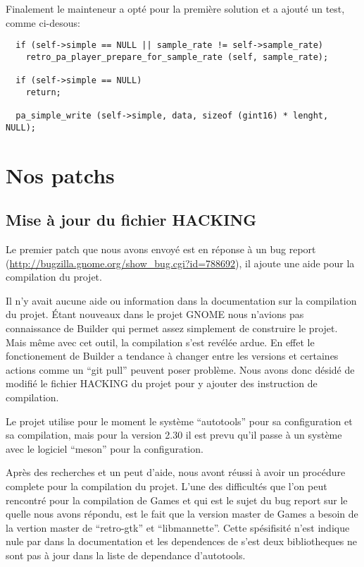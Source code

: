\documentclass[12pt]{report}
\begin{document}
Finalement le mainteneur a opté pour la première solution et a ajouté un test, comme
ci-desous:
\begin{verbatim}
  if (self->simple == NULL || sample_rate != self->sample_rate)
    retro_pa_player_prepare_for_sample_rate (self, sample_rate);

  if (self->simple == NULL)
    return;

  pa_simple_write (self->simple, data, sizeof (gint16) * lenght, NULL);
\end{verbatim}

\section{Nos patchs}
\subsection{Mise à jour du fichier HACKING}
\label{HACKING}
Le premier patch que nous avons envoyé est en réponse à un bug report
(\url{http://bugzilla.gnome.org/show_bug.cgi?id=788692}), il ajoute une aide
pour la compilation du projet.

Il n'y avait aucune aide ou information dans la documentation sur la compilation
du projet. Étant nouveaux dans le projet GNOME nous n'avions pas connaissance de 
Builder qui permet assez simplement de construire le projet. Mais même avec cet
outil, la compilation s'est revélée ardue. En effet le fonctionement de Builder a
tendance à changer entre les versions et certaines actions comme un ``git pull''
peuvent poser problème. Nous avons donc désidé de modifié le fichier HACKING du
projet pour y ajouter des instruction de compilation.

Le projet utilise pour le moment le système ``autotools'' pour sa configuration et 
sa compilation, mais pour la version 2.30 il est prevu qu'il passe à un système
avec le logiciel ``meson'' pour la configuration.

Après des recherches et un peut d'aide, nous avont réussi à avoir un procédure
complete pour la compilation du projet. L'une des difficultés que l'on peut
rencontré pour la compilation de Games et qui est le sujet du bug report sur le
quelle nous avons répondu, est le fait que la version master de Games a besoin de
la vertion master de ``retro-gtk'' et ``libmannette''. Cette spésifisité n'est
indique nule par dans la documentation et les dependences de s'est deux
bibliotheques ne sont pas à jour dans la liste de dependance d'autotools.
\end{document}
